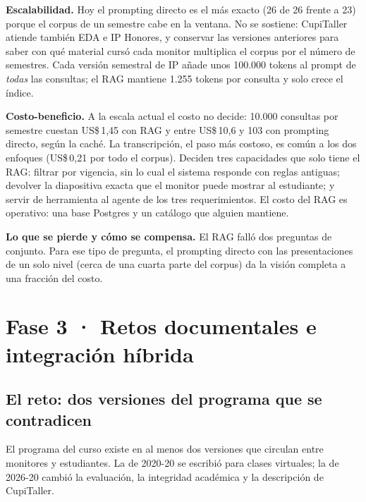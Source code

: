 \documentclass[11pt,letterpaper]{article}
\begin{document}
\textbf{Escalabilidad.} Hoy el prompting directo es el más exacto (26 de 26 frente a 23) porque el corpus de un semestre cabe en la ventana. No se sostiene: CupiTaller atiende también EDA e IP Honores, y conservar las versiones anteriores para saber con qué material cursó cada monitor multiplica el corpus por el número de semestres. Cada versión semestral de IP añade unos 100.000 tokens al prompt de \emph{todas} las consultas; el RAG mantiene 1.255 tokens por consulta y solo crece el índice.

\textbf{Costo-beneficio.} A la escala actual el costo no decide: 10.000 consultas por semestre cuestan US\$\,1,45 con RAG y entre US\$\,10,6 y 103 con prompting directo, según la caché. La transcripción, el paso más costoso, es común a los dos enfoques (US\$\,0,21 por todo el corpus). Deciden tres capacidades que solo tiene el RAG: filtrar por vigencia, sin lo cual el sistema responde con reglas antiguas; devolver la diapositiva exacta que el monitor puede mostrar al estudiante; y servir de herramienta al agente de los tres requerimientos. El costo del RAG es operativo: una base Postgres y un catálogo que alguien mantiene.

\textbf{Lo que se pierde y cómo se compensa.} El RAG falló dos preguntas de conjunto. Para ese tipo de pregunta, el prompting directo con las presentaciones de un solo nivel (cerca de una cuarta parte del corpus) da la visión completa a una fracción del costo.

\section{Fase 3 · Retos documentales e integración híbrida}

\subsection{El reto: dos versiones del programa que se contradicen}

El programa del curso existe en al menos dos versiones que circulan entre monitores y estudiantes. La de 2020-20 se escribió para clases virtuales; la de 2026-20 cambió la evaluación, la integridad académica y la descripción de CupiTaller.
\end{document}
